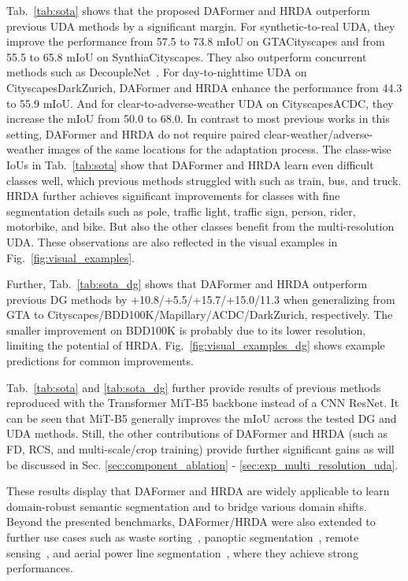 \documentclass[journal,compsoc]{IEEEtran}
\begin{document}
Tab.~\ref{tab:sota} shows that the proposed DAFormer and HRDA outperform previous UDA methods by a significant margin.
For synthetic-to-real UDA, they improve the performance from 57.5 to 73.8 mIoU on GTACityscapes and from 55.5 to 65.8 mIoU on SynthiaCityscapes. They also outperform concurrent methods such as DecoupleNet~\cite{lai2022decouplenet}.
For day-to-nighttime UDA on CityscapesDarkZurich, DAFormer and HRDA enhance the performance from 44.3 to 55.9 mIoU. And for clear-to-adverse-weather UDA on CityscapesACDC, they increase the mIoU from 50.0 to 68.0. In contrast to most previous works in this setting, DAFormer and HRDA do not require paired clear-weather/adverse-weather images of the same locations for the adaptation process.
The class-wise IoUs in Tab.~\ref{tab:sota} show that DAFormer and HRDA learn even difficult classes well, which previous methods struggled with such as train, bus, and truck. HRDA further achieves significant improvements for classes with fine segmentation details such as pole, traffic light, traffic sign, person, rider, motorbike, and bike. But also the other classes benefit from the multi-resolution UDA. These observations are also reflected in the visual examples in Fig.~\ref{fig:visual_examples}.


Further, Tab.~\ref{tab:sota_dg} shows that DAFormer and HRDA outperform previous DG methods by +10.8/\allowbreak +5.5/\allowbreak +15.7/+15.0/11.3 when generalizing from GTA to Cityscapes/\allowbreak BDD100K/\allowbreak Mapillary/\allowbreak ACDC/\allowbreak DarkZurich, respectively. The smaller improvement on BDD100K is probably due to its lower resolution, limiting the potential of HRDA. Fig.~\ref{fig:visual_examples_dg} shows example predictions for common improvements.

Tab.~\ref{tab:sota} and \ref{tab:sota_dg} further provide results of previous methods reproduced with the Transformer MiT-B5 backbone instead of a CNN ResNet. It can be seen that MiT-B5 generally improves the mIoU across the tested DG and UDA methods. Still, the other contributions of DAFormer and HRDA (such as FD, RCS, and multi-scale/crop training) provide further significant gains as will be discussed in Sec. \ref{sec:component_ablation} - \ref{sec:exp_multi_resolution_uda}.

These results display that DAFormer and HRDA are widely applicable to learn domain-robust semantic segmentation and to bridge various domain shifts.
Beyond the presented benchmarks, DAFormer/HRDA were also extended to further use cases such as 
waste sorting~\cite{bashkirova2023visda},
panoptic segmentation~\cite{saha2023edaps},
remote sensing~\cite{xia2023openearthmap}, and aerial power line segmentation~\cite{rao2022quadformer}, where they achieve strong performances.
\end{document}
